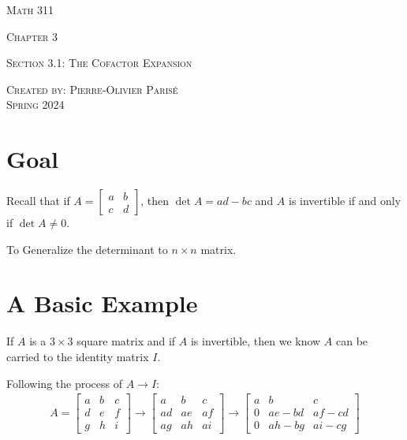 \documentclass[20pt,a4paper]{extarticle}
\newcommand{\ra}{\rightarrow}
\begin{document}
\thispagestyle{empty}

\begin{center}
\vspace*{0.5cm}

{\Huge \textsc{Math 311}}

\vspace*{1cm}

{\LARGE \textsc{Chapter 3}} 

\vspace*{0.75cm}

\noindent\textsc{Section 3.1: The Cofactor Expansion}

\vspace*{0.25cm}

\tableofcontents

\vfill

\noindent \textsc{Created by: Pierre-Olivier Paris{\'e}} \\
\textsc{Spring 2024}
\end{center}

\newpage

\section{Goal}

Recall that if $A = \begin{bmatrix} a & b \\ c & d \end{bmatrix}$, then $\det A = ad - bc$
and $A$ is invertible if and only if $\det A \neq 0$.

\begin{goal}
To Generalize the determinant to $n \times n$ matrix.
\end{goal}

\section{A Basic Example}

If $A$ is a $3 \times 3$ square matrix and if $A$ is invertible, then we know $A$ can be carried to the identity matrix $I$. 

Following the process of $A \ra I$:
\begin{align*}
A = \begin{bmatrix} a & b & c \\ d & e & f \\ g & h & i \end{bmatrix} \ra \begin{bmatrix} a & b & c \\ ad & ae & af \\ ag & ah & ai \end{bmatrix} \ra \begin{bmatrix} a & b & c \\ 0 & ae - bd & af - cd \\ 0 & ah - bg & ai - cg \end{bmatrix}
\end{align*}
\end{document}
